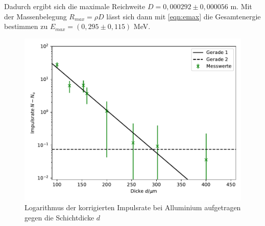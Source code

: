 Dadurch ergibt sich die maximale Reichweite $D = 0,000292 \pm 0,000056$ m. Mit der Massenbelegung $R_{max} = \rho D$ lässt
sich dann mit \autoref{eqn:emax} die Gesamtenergie bestimmen zu $E_{max} = (0,295 \pm 0,115)$ MeV.
\begin{figure}
  \centering
  \includegraphics{Bilder/beta.pdf}
  \caption{Logarithmus der korrigierten Impulsrate bei Alluminium aufgetragen gegen die Schichtdicke $d$}
  \label{fig:Beta}
\end{figure}